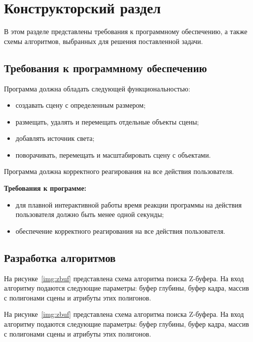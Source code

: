 \chapter{Конструкторский раздел}

В этом разделе представлены требования к программному обеспечению, а также схемы алгоритмов, выбранных для решения поставленной задачи.

\section{Требования к программному обеспечению}
Программа должна обладать следующей функциональностью:
\begin{itemize}
	\item создавать сцену с определенным размером;
	\item размещать, удалять и перемещать отдельные объекты сцены;
	\item добавлять источник света;
	\item поворачивать, перемещать и масштабировать сцену с объектами.
\end{itemize}

Программа должна корректного реагирования на все действия пользователя.

\textbf{Требования к программе: }
\begin{itemize}
	\item для плавной интерактивной работы время реакции программы на действия пользователя должно быть менее одной секунды;
	\item обеспечение корректного реагирования на все действия пользователя.
\end{itemize}
\fi 

\section{Разработка алгоритмов}

На рисунке~\ref{img:zbuf} представлена схема алгоритма поиска Z-буфера.
На вход алгоритму подаются следующие параметры: буфер глубины, буфер кадра,
массив с полигонами сцены и атрибуты этих полигонов.

На рисунке~\ref{img:zbuf} представлена схема алгоритма поиска Z-буфера.
На вход алгоритму подаются следующие параметры: буфер глубины, буфер кадра,
массив с полигонами сцены и атрибуты этих полигонов.


